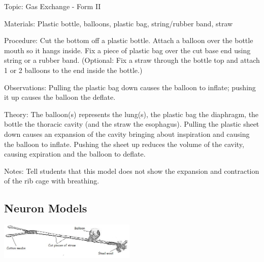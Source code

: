 \begin{multicols}{2}
\begin{description*}
\item[Topic:]{Gas Exchange - Form II}
\item[Materials:]{Plastic bottle, balloons, plastic bag, string/rubber band, straw}
\item[Procedure:]{Cut the bottom off a plastic
bottle. Attach a balloon over the
bottle mouth so it hangs inside.
Fix a piece of plastic bag over the
cut base end using string or a rubber band. (Optional: Fix a straw through the bottle top and attach 1 or 2 balloons to the end inside the bottle.)}
\item[Observations:]{Pulling the plastic bag down causes the balloon to inflate; pushing it up causes the balloon the deflate.}
\item[Theory:]{The balloon(s) represents the lung(s), the plastic bag the diaphragm, the bottle the thoracic cavity (and the straw the esophagus). Pulling the plastic sheet down causes an expansion of the cavity bringing about inspiration and causing the balloon to inflate. Pushing the sheet up reduces the volume of the cavity, causing expiration and the balloon to deflate.}
\item[Notes:]{Tell students that this model does not show the expansion and contraction of the rib cage with breathing.}
\end{description*}

\subsection{Neuron Models}

\begin{center}
\includegraphics[width=0.49\textwidth]{./img/neuron-model.jpg}
\end{center}


\end{multicols}
